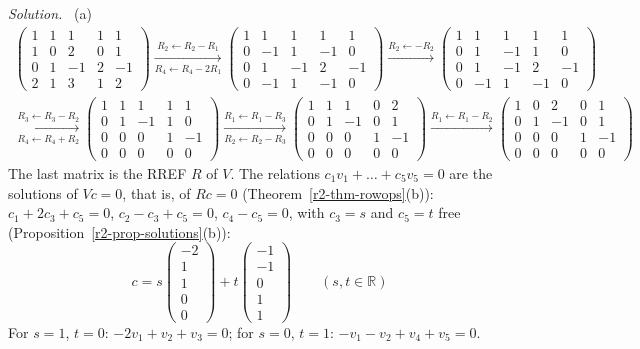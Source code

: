 \documentclass[12pt]{article}
\newcommand{\R}{\mathbb R}
\theoremstyle{definition}
\newenvironment{solution}{\par\noindent\textit{Solution.}\ }{\par\smallskip}
\begin{document}
\begin{solution}
(a)
\[
\begin{gathered}
\begin{pmatrix}1&1&1&1&1\\1&0&2&0&1\\0&1&-1&2&-1\\2&1&3&1&2\end{pmatrix}
\xrightarrow[R_4\leftarrow R_4-2R_1]{R_2\leftarrow R_2-R_1}
\begin{pmatrix}1&1&1&1&1\\0&-1&1&-1&0\\0&1&-1&2&-1\\0&-1&1&-1&0\end{pmatrix}
\xrightarrow{R_2\leftarrow-R_2}
\begin{pmatrix}1&1&1&1&1\\0&1&-1&1&0\\0&1&-1&2&-1\\0&-1&1&-1&0\end{pmatrix}
\\
\xrightarrow[R_4\leftarrow R_4+R_2]{R_3\leftarrow R_3-R_2}
\begin{pmatrix}1&1&1&1&1\\0&1&-1&1&0\\0&0&0&1&-1\\0&0&0&0&0\end{pmatrix}
\xrightarrow[R_2\leftarrow R_2-R_3]{R_1\leftarrow R_1-R_3}
\begin{pmatrix}1&1&1&0&2\\0&1&-1&0&1\\0&0&0&1&-1\\0&0&0&0&0\end{pmatrix}
\xrightarrow{R_1\leftarrow R_1-R_2}
\begin{pmatrix}1&0&2&0&1\\0&1&-1&0&1\\0&0&0&1&-1\\0&0&0&0&0\end{pmatrix}
\end{gathered}
\]
The last matrix is the RREF \(R\) of \(V\). The relations \(c_1v_1+\dots+c_5v_5=0\) are the solutions
of \(Vc=0\), that is, of \(Rc=0\) (Theorem~\ref{r2-thm-rowops}(b)): \(c_1+2c_3+c_5=0\),
\(c_2-c_3+c_5=0\), \(c_4-c_5=0\), with \(c_3=s\) and \(c_5=t\) free
(Proposition~\ref{r2-prop-solutions}(b)):
\[
c=s\begin{pmatrix}-2\\1\\1\\0\\0\end{pmatrix}+t\begin{pmatrix}-1\\-1\\0\\1\\1\end{pmatrix}\qquad(s,t\in\R)
\]
For \(s=1\), \(t=0\): \(-2v_1+v_2+v_3=0\); for \(s=0\), \(t=1\): \(-v_1-v_2+v_4+v_5=0\).


\end{solution}
\end{document}
